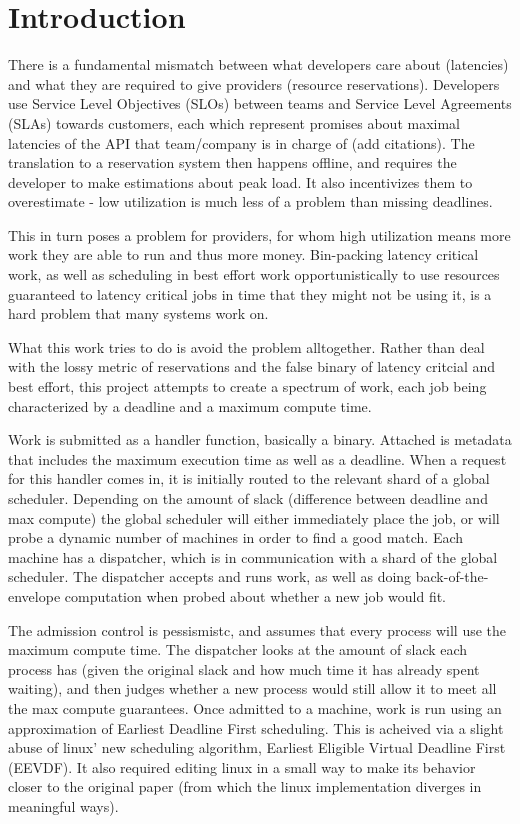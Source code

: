 \section{Introduction}


There is a fundamental mismatch between what developers care about (latencies)
and what they are required to give providers (resource reservations). Developers
use Service Level Objectives (SLOs) between teams and Service Level Agreements
(SLAs) towards customers, each which represent promises about maximal latencies
of the API that team/company is in charge of (add citations). The translation to
a reservation system then happens offline, and requires the developer to make
estimations about peak load.  It also incentivizes them to overestimate - low
utilization is much less of a problem than missing deadlines. 

This in turn poses a problem for providers, for whom high utilization means more
work they are able to run and thus more money. Bin-packing latency critical
work, as well as scheduling in best effort work opportunistically to use
resources guaranteed to latency critical jobs in time that they might not be
using it, is a hard problem that many systems work on.

What this work tries to do is avoid the problem alltogether. Rather than deal
with the lossy metric of reservations and the false binary of latency critcial
and best effort, this project attempts to create a spectrum of work, each job
being characterized by a deadline and a maximum compute time.

Work is submitted as a handler function, basically a binary. Attached is
metadata that includes the maximum execution time as well as a deadline. When a
request for this handler comes in, it is initially routed to the relevant shard
of a global scheduler. Depending on the amount of slack (difference between
deadline and max compute) the global scheduler will either immediately place the
job, or will probe a dynamic number of machines in order to find a good match.
Each machine has a dispatcher, which is in communication with a shard of the
global scheduler. The dispatcher accepts and runs work, as well as doing
back-of-the-envelope computation when probed about whether a new job would fit. 

The admission control is pessismistc, and assumes that every process will use
the maximum compute time. The dispatcher looks at the amount of slack each
process has (given the original slack and how much time it has already spent
waiting), and then judges whether a new process would still allow it to meet all
the max compute guarantees. Once admitted to a machine, work is run using an
approximation of Earliest Deadline First scheduling. This is acheived via a
slight abuse of linux' new scheduling algorithm, Earliest Eligible Virtual
Deadline First (EEVDF). It also required editing linux in a small way to make
its behavior closer to the original paper (from which the linux implementation
diverges in meaningful ways).

